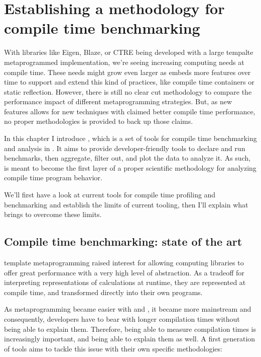 \documentclass[../../main.tex]{subfiles}
\begin{document}
\chapter{Establishing a methodology for compile time benchmarking}

With libraries like Eigen\cite{eigen}, Blaze\cite{blazelib}, or CTRE\cite{ctre} being
developed with a large tempalte metaprogrammed implementation, we're seeing
increasing computing needs at compile time. These needs might grow even larger
as \cpp embeds more features over time to support and extend this kind of
practices, like compile time containers\cite{more-constexpr-containers} or static
reflection\cite{static-reflection}. However, there is still no clear cut methodology
to compare the performance impact of different metaprogramming strategies. But,
as new \cpp features allows for new techniques with claimed better compile time
performance, no proper methodologies is provided to back up those claims.

In this chapter I introduce \ctbench, which is a set of tools for compile time
benchmarking and analysis in \cpp. It aims to provide developer-friendly tools
to declare and run benchmarks, then aggregate, filter out, and plot the data to
analyze it. As such, \ctbench is meant to become the first layer of a proper
scientific methodology for analyzing compile time program behavior.

We'll first have a look at current tools for compile time profiling and
benchmarking and establish the limits of current tooling, then I'll explain
what \ctbench brings to overcome these limits.

\section{Compile time benchmarking: state of the art}

\cpp template metaprogramming raised interest for allowing computing libraries to
offer great performance with a very high level of abstraction. As a tradeoff for
interpreting representations of calculations at runtime, they are represented at
compile time, and transformed directly into their own programs.

As metaprogramming became easier with  and , it became more mainstream
and consequently, developers have to bear with longer compilation times without
being able to explain them. Therefore, being able to measure compilation times
is increasingly important, and being able to explain them as well. A first
generation of tools aims to tackle this issue with their own specific
methodologies:
\end{document}
